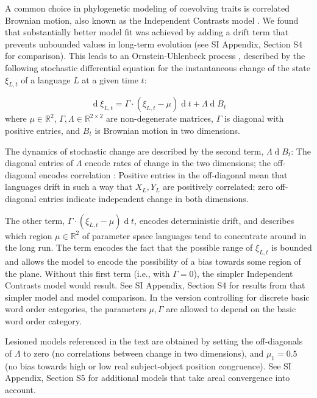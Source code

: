 \documentclass[9pt,twocolumn,twoside,lineno]{pnas-new}
\begin{document}
{A common choice in phylogenetic modeling of coevolving traits is correlated Brownian motion, also known as the Independent Contrasts model \citep{felsenstein1973maximum,freckleton2012fast}.
We found that substantially better model fit was achieved by adding a drift term that prevents unbounded values  in long-term evolution (see SI Appendix, Section S4 for comparison).
This leads to an Ornstein-Uhlenbeck process \citep{felsenstein1988phylogenies,hansen1997stabilizing,blackwell2003bayesian}, described by the following stochastic differential equation for the instantaneous change of the state $\xi_{L,t}$ of a language $L$ at a given time $t$:

\begin{equation*}
    \operatorname{d}\xi_{L,t} = \Gamma \cdot (\xi_{L,t}-\mu) \operatorname{d}t + \Lambda \operatorname{d}B_t
\end{equation*}
where $\mu \in \mathbb{R}^2$,  $\Gamma, \Lambda \in \mathbb{R}^{2\times 2}$ are non-degenerate matrices, $\Gamma$ is diagonal with positive entries, and $B_t$ is Brownian motion in two dimensions.

The dynamics of stochastic change are described by the second term, $\Lambda \operatorname{d}B_t$:
The diagonal entries of $\Lambda$ encode rates of change in the two dimensions; the off-diagonal encodes correlation \citep{felsenstein1973maximum,freckleton2012fast}: Positive entries in the off-diagonal mean that languages drift in such a way that $X_L, Y_L$ are positively correlated; zero off-diagonal entries indicate independent change in both dimensions.



The other term, $\Gamma \cdot (\xi_{L,t}-\mu) \operatorname{d}t$, encodes deterministic drift, and describes which region $\mu \in \mathbb{R}^2$ of parameter space languages tend to concentrate around in the long run.
The term encodes the fact that the possible range of $\xi_{L,t}$ is bounded and allows the model to encode the possibility of a bias towards some region of the plane.
Without this first term (i.e., with $\Gamma =0$), the simpler Independent Contrasts model \citep{felsenstein1973maximum,freckleton2012fast} would result. See SI Appendix, Section S4 for results from that simpler model and model comparison.
In the version controlling for discrete basic word order categories, the parameters $\mu, \Gamma$ are allowed to depend on the basic word order category.

Lesioned models referenced in the text are obtained by setting the off-diagonals of $\Lambda$ to zero (no correlations between change in two dimensions), and $\mu_1=0.5$ (no bias towards high or low real subject-object position congruence).
See SI Appendix, Section S5 for additional models that take areal convergence into account.


}
\end{document}

